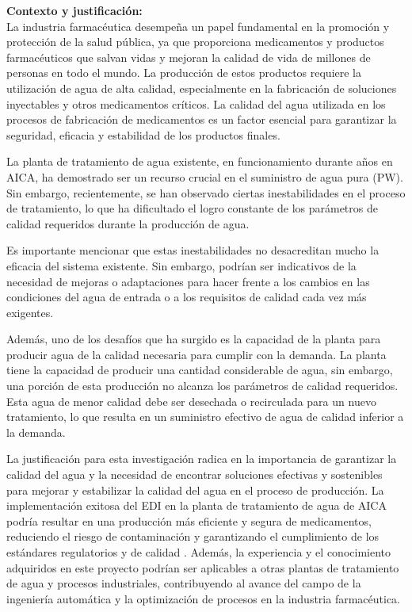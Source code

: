 \textbf{Contexto y justificación:}\\
La industria farmacéutica desempeña un papel fundamental en la promoción y protección de la salud pública,
ya que proporciona medicamentos y productos farmacéuticos que salvan vidas y mejoran la calidad de vida
de millones de personas en todo el mundo. La producción de estos productos requiere la utilización de
agua de alta calidad, especialmente en la fabricación de soluciones inyectables y otros medicamentos
críticos. La calidad del agua utilizada en los procesos de fabricación de medicamentos es un factor
esencial para garantizar la seguridad, eficacia y estabilidad de los productos finales.

La planta de tratamiento de agua existente, en funcionamiento durante años en AICA,
ha demostrado ser un recurso crucial en el suministro de agua pura (PW).
Sin embargo, recientemente, se han observado ciertas inestabilidades en el
proceso de tratamiento, lo que ha dificultado el logro constante de los parámetros
de calidad requeridos durante la producción de agua.

Es importante mencionar que estas inestabilidades no desacreditan mucho la eficacia
del sistema existente. Sin embargo, podrían ser indicativos de la necesidad
de mejoras o adaptaciones para hacer frente a los cambios en las condiciones
del agua de entrada o a los requisitos de calidad cada vez más exigentes.

Además, uno de los desafíos que ha surgido es la capacidad de la
planta para producir agua de la calidad necesaria para cumplir con la demanda.
La planta tiene la capacidad de producir una cantidad considerable de agua,
sin embargo, una porción de esta producción no alcanza los parámetros de
calidad requeridos. Esta agua de menor calidad debe ser desechada o
recirculada para un nuevo tratamiento, lo que resulta en un suministro
efectivo de agua de calidad inferior a la demanda.

La justificación para esta investigación radica en la importancia de garantizar la calidad del agua
y la necesidad de encontrar soluciones efectivas y sostenibles para
mejorar y estabilizar la calidad del agua en el proceso de producción. La implementación exitosa
del EDI en la planta de tratamiento de agua de AICA podría resultar en una producción más eficiente
y segura de medicamentos, reduciendo el riesgo de contaminación y garantizando el cumplimiento de los
estándares regulatorios y de calidad \cite{alvaradoElectrodeionizationPrinciplesStrategies2014}. Además, la experiencia y el conocimiento adquiridos en este proyecto
podrían ser aplicables a otras plantas de tratamiento de agua y procesos industriales, contribuyendo al avance
del campo de la ingeniería automática y la optimización de procesos en la industria farmacéutica.

